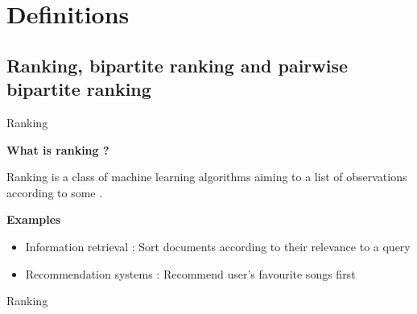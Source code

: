 \section{Definitions}
\subsection{Ranking, bipartite ranking and pairwise bipartite ranking}

\begin{frame}{Ranking}

    {\large\textbf{What is ranking ?}}
    
    Ranking is a class of machine learning algorithms aiming to  a list of observations according to some . 
    
    \vspace{0.3cm}
    
    {\large\textbf{Examples}}
    
    \begin{itemize}
        \item Information retrieval : Sort documents according to their relevance to a query
        \item Recommendation systems : Recommend user's favourite songs first
    \end{itemize}
\end{frame}

\begin{frame}{Ranking}
    \begin{figure}[H]
        \centering
    \end{figure}
\end{frame}

